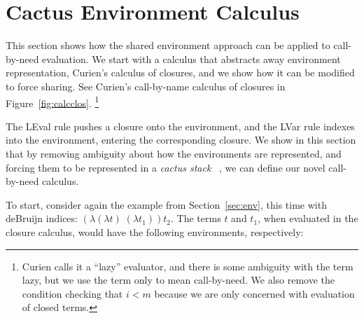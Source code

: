 \section{Cactus Environment Calculus} \label{sec:calc}

This section shows how the shared environment approach can be applied to
call-by-need evaluation. We start with a calculus that abstracts away
environment representation, Curien's calculus of closures, and we show how it
can be modified to force sharing. See Curien's call-by-name calculus of closures
in Figure~\ref{fig:calcclos}. \footnote{Curien calls it a ``lazy'' evaluator, and
there is some ambiguity with the term lazy, but we use the term only to mean
call-by-need. We also remove the condition checking that $i < m$ because we are
only concerned with evaluation of closed terms.}

The LEval rule pushes a closure onto the environment, and the LVar rule indexes
into the environment, entering the corresponding closure. We show in this
section that by removing ambiguity about how the environments are represented,
and forcing them to be represented in a \emph{cactus stack}
~\cite{stenstrom1988vlsi}, we can define our novel call-by-need calculus.

To start, consider again the example from Section~\ref{sec:env}, this
time with deBruijn indices: $(\lambda(\lambda t) \; (\lambda t_1)) t_2$.  The
terms $t$ and $t_1$, when evaluated in the closure calculus, would have the
following environments, respectively: 

\begin{center}
\end{center}

